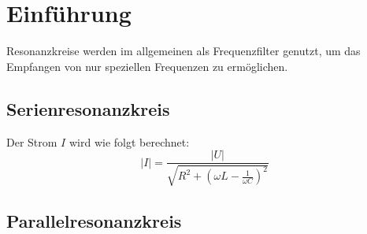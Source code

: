 \section{Einführung}
Resonanzkreise werden im allgemeinen als Frequenzfilter genutzt, um das Empfangen von nur speziellen Frequenzen zu ermöglichen.
\subsection{Serienresonanzkreis}
Der Strom $I$ wird wie folgt berechnet:
\begin{equation}
  |I|=\frac{|U|}{\sqrt{R^2+(\omega L-\frac{1}{\omega C})^2}}
  \label{eq:serienstrom}
\end{equation}
\subsection{Parallelresonanzkreis}

